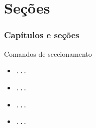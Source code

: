 
\section{Seções}

\begin{frame}
  \frametitle{Capítulos e seções}

  \begin{block}{Comandos de seccionamento}
    \begin{itemize}
    \item \texttt{\green{\string\chapter}\ac{}...\fc{}}
    \item \texttt{\blue{\string\section}\ac{}...\fc{}}
    \item \texttt{\blue{\string\subsection}\ac{}...\fc{}}
    \item \texttt{\blue{\string\subsubsection}\ac{}...\fc{}}
    \end{itemize}
  \end{block}

\end{frame}

